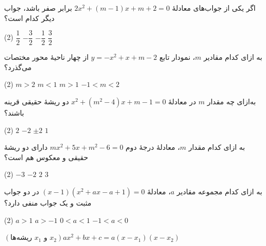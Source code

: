 
\begin{example}
اگر یکی از جواب‌های معادلهٔ
$2x^2+(m-1)x+m+2=0$
برابر صفر باشد، جواب دیگر کدام است؟

\begin{tasks}(2)
    \task \(\dfrac{1}{2}\)
    \task \(-\dfrac{3}{2}\)
    \task \(-\dfrac{1}{2}\)
    \task \(\dfrac{3}{2}\)
\end{tasks}
\end{example}


\begin{example}
به ازای کدام مقادیر \(m\)، نمودار تابع
$y=-x^2+x+m-2$
از چهار ناحیۀ محور مختصات می‌گذرد؟

\begin{tasks}(2)
    \task \(m>2\)
    \task \(m<1\)
    \task \(m>1\)
    \task \(-1<m<2\)
\end{tasks}
\end{example}


\begin{example}
به‌ازای چه مقدار \(m\) در معادلهٔ
$x^2+(m^2-4)x+m-1=0$
دو ریشهٔ حقیقی قرینه باشند؟

\begin{tasks}(2)
    \task \(2\)
    \task \(-2\)
    \task \(\pm 2\)
    \task \(1\)
\end{tasks}
\end{example}


\begin{example}
به ازای کدام مقدار \(m\)، معادلهٔ درجهٔ دوم
$mx^2+5x+m^2-6=0$
دارای دو ریشهٔ حقیقی و معکوس هم است؟

\begin{tasks}(2)
    \task \(-3\)
    \task \(-2\)
    \task \(2\)
    \task \(3\)
\end{tasks}
\end{example}


\begin{example}
به ازای کدام مجموعه مقادیر \(a\)، معادلهٔ
$(x-1)(x^2+ax-a+1)=0$
در دو جواب مثبت و یک جواب منفی دارد؟

\begin{tasks}(2)
    \task \(a>1\)
    \task \(a>-1\)
    \task \(0<a<1\)
    \task \(-1<a<0\)
\end{tasks}
\end{example}


\begin{remark}\hfil$(\text{ریشه‌ها }x_1\text{ و }x_2)$\hfill$\displaystyle ax^2+bx+c=a(x-x_1)(x-x_2)$\end{remark}

